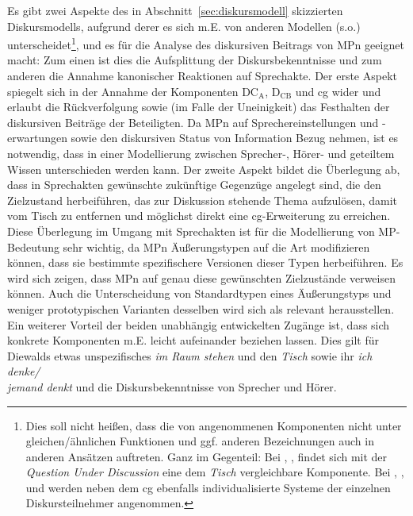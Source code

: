 Es gibt zwei Aspekte des in Abschnitt~\ref{sec:diskursmodell} skizzierten Diskursmodells, aufgrund derer es sich m.E. von anderen Modellen (s.o.) unterscheidet\footnote{Dies soll nicht heißen, dass die von \citet{Farkas2010} angenommenen Komponenten nicht unter gleichen/ähnlichen Funktionen und ggf. anderen Bezeichnungen auch in anderen Ansätzen auftreten. Ganz im Gegenteil: Bei \citet{Ginzburg1995a, Ginzburg1995b, Ginzburg1996}, \citet{Roberts1996}, \citet{Buering2003} findet sich mit der \textit{Question Under Discussion} eine dem \textit{Tisch} vergleichbare Komponente. Bei \citet{Hamblin1971}, \citet{Bartels1999}, \citet{Gunlogson2003} und \citet{Caponigro2007} werden neben dem cg ebenfalls individualisierte Systeme der einzelnen Diskursteilnehmer angenommen.}, und es für die Analyse des diskursiven Beitrags von MPn geeignet macht: Zum einen ist dies die Aufsplittung der Diskursbekenntnisse und zum anderen die Annahme kano\-nischer Reaktionen auf  Sprechakte. Der erste Aspekt spiegelt sich in der Annahme der Komponenten $\textrm{DC}_{\textrm{A}}$, $\textrm{D}_{\textrm{CB}}$ und cg wider und erlaubt die Rückverfolgung sowie (im Falle der Uneinigkeit) das Festhalten der diskursiven Beiträge der Beteiligten. Da MPn auf Sprechereinstellungen und -erwartungen sowie den diskursiven Status von Information Bezug nehmen, ist es notwendig, dass in einer Modellierung zwischen Sprecher-, Hörer- und geteiltem Wissen unterschieden werden kann. Der zweite Aspekt bildet die Überlegung ab, dass in Sprechakten gewünschte zukünftige Gegenzüge angelegt sind, die den Zielzustand herbeiführen, das zur Diskussion stehende Thema aufzulösen, damit vom Tisch zu entfernen und möglichst direkt eine cg-Erweiterung zu erreichen. Diese Überlegung im Umgang mit Sprechakten ist für die Modellierung von MP-Bedeu\-tung sehr wichtig, da MPn Äußerungstypen auf die Art modifizieren können, dass sie bestimmte spezifischere Versionen dieser Typen herbeiführen. Es wird sich zeigen, dass MPn auf genau diese gewünschten Zielzustände verweisen können. Auch die Unterscheidung von Standardtypen eines Äußerungstyps und weniger prototy\-pischen Varianten desselben wird sich als relevant herausstellen. Ein weiterer Vorteil der beiden unabhängig entwickelten Zugänge ist, dass sich konkrete Komponenten m.E. leicht aufeinander beziehen lassen. Dies gilt für Diewalds etwas unspezifisches \textit{im Raum stehen} und den \textit{Tisch} sowie ihr \textit{ich denke/\\jemand denkt} und die Diskursbekenntnisse von Sprecher und Hörer.\\

